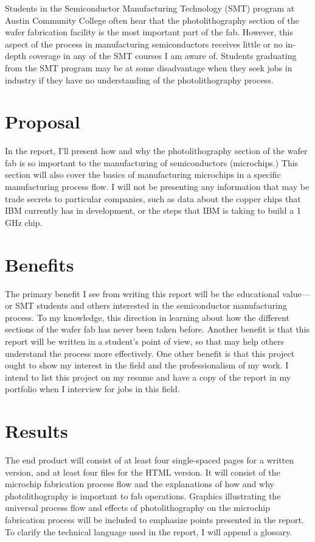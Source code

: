 Students in the Semiconductor Manufacturing Technology (SMT) program at Austin Community College often hear that the photolithography section of the wafer fabrication facility is the most important part of the fab. However, this aspect of the process in manufacturing semiconductors receives little or no in-depth coverage in any of the SMT courses I am aware of. Students graduating from the SMT program may be at some disadvantage when they seek jobs in industry if they have no understanding of the photolithography process.
\section*{Proposal}
In the report, I'll present how and why the photolithography section of the wafer fab is so important to the manufacturing of semiconductors (microchips.) This section will also cover the basics of manufacturing microchips in a specific manufacturing process flow. I will not be presenting any information that may be trade secrets to particular companies, such as data about the copper chips that IBM currently has in development, or the steps that IBM is taking to build a 1 GHz chip.
\section*{Benefits}
The primary benefit I see from writing this report will be the educational value—or SMT students and others interested in the semiconductor manufacturing process. To my knowledge, this direction in learning about how the different sections of the wafer fab has never been taken before. Another benefit is that this report will be written in a student's point of view, so that may help others understand the process more effectively. One other benefit is that this project ought to show my interest in the field and the professionalism of my work. I intend to list this project on my resume and have a copy of the report in my portfolio when I interview for jobs in this field.
\section*{Results}
The end product will consist of at least four single-spaced pages for a written version, and at least four files for the HTML version. It will consist of the microchip fabrication process flow and the explanations of how and why photolithography is important to fab operations. Graphics illustrating the universal process flow and effects of photolithography on the microchip fabrication process will be included to emphasize points presented in the report. To clarify the technical language used in the report, I will append a glossary.
